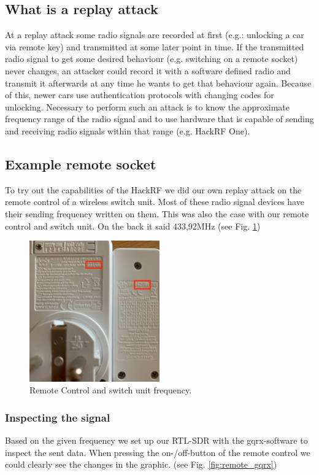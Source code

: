 \documentclass[conference]{IEEEtran}
\begin{document}
\subsection{What is a replay attack}
At a replay attack some radio signals are recorded at first (e.g.: unlocking a car via remote key) and transmitted at some later point in time.  If the transmitted radio signal to get some desired behaviour (e.g. switching on a remote socket) never changes, an attacker could record it with a software defined radio and transmit it afterwards at any time he wants to get that behaviour again. Because of this, newer cars use authentication protocols with changing codes for unlocking. \cite{verdult2015cryptanalysis} Necessary to perform such an attack is to know the approximate frequency range of the radio signal and to use hardware that is capable of sending and receiving radio signals within that range (e.g. HackRF One). 

\subsection{Example remote socket}
To try out the capabilities of the HackRF we did our own replay attack on the remote control of a wireless switch unit. Most of these radio signal devices have their sending frequency written on them. This was also the case with our remote control and switch unit. On the back it said 433,92MHz (see Fig. \ref{fig:remote})

\begin{figure}[H]
	\centering
	\includegraphics[width=0.5\textwidth]{remote_control_and_switch}
	\caption{Remote Control and switch unit frequency.}
	\label{fig:remote}
\end{figure}

\subsubsection{Inspecting the signal}
Based on the given frequency we set up our RTL-SDR with the gqrx-software to inspect the sent data. When pressing the on-/off-button of the remote control we could clearly see the changes in the graphic. (see Fig. \ref{fig:remote_gqrx})
\end{document}
